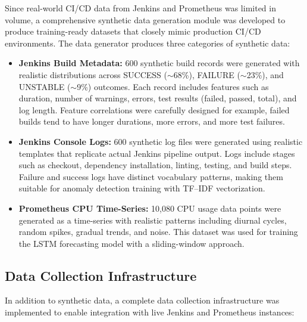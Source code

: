 \documentclass[a4paper,14pt,onecolumn]{report}
\begin{document}
Since real-world CI/CD data from Jenkins and Prometheus was limited in volume, a comprehensive synthetic data generation module was developed to produce training-ready datasets that closely mimic production CI/CD environments. The data generator produces three categories of synthetic data:

\begin{itemize}
    \item \textbf{Jenkins Build Metadata:} 600 synthetic build records were generated with realistic distributions across SUCCESS ($\sim$68\%), FAILURE ($\sim$23\%), and UNSTABLE ($\sim$9\%) outcomes. Each record includes features such as duration, number of warnings, errors, test results (failed, passed, total), and log length. Feature correlations were carefully designed for example, failed builds tend to have longer durations, more errors, and more test failures.

    \item \textbf{Jenkins Console Logs:} 600 synthetic log files were generated using realistic templates that replicate actual Jenkins pipeline output. Logs include stages such as checkout, dependency installation, linting, testing, and build steps. Failure and success logs have distinct vocabulary patterns, making them suitable for anomaly detection training with TF--IDF vectorization.

    \item \textbf{Prometheus CPU Time-Series:} 10,080 CPU usage data points were generated as a time-series with realistic patterns including diurnal cycles, random spikes, gradual trends, and noise. This dataset was used for training the LSTM forecasting model with a sliding-window approach.
\end{itemize}

\subsection{Data Collection Infrastructure}

In addition to synthetic data, a complete data collection infrastructure was implemented to enable integration with live Jenkins and Prometheus instances:
\end{document}
